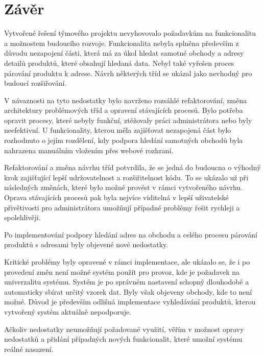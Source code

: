 \documentclass[thesis=B,czech]{FITthesis}[2012/06/26]
\begin{document}
\chapter{Závěr}
Vytvořené řešení týmového projektu nevyhovovalo požadavkům na funkcionalitu a možnostem budoucího rozvoje.
Funkcionalita nebyla splněna především z důvodu nezapojení části, která má za úkol hledat samotné obchody a adresy detailů produktů, které obsahují
hledaná data. Nebyl také vyřešen proces párování produktu k adrese. Návrh některých tříd se ukázal jako nevhodný pro budoucí rozšiřování.
\par
V návaznosti na tyto nedostatky bylo navrženo rozsáhlé refaktorování, změna architektury problémových tříd a opravení stávajících
procesů. Bylo potřeba opravit procesy, které nebyly funkční, ztěžovaly práci administrátora nebo byly neefektivní. U funkcionality, kterou měla zajišťovat nezapojená část bylo rozhodnuto o jejím rozdělení, kdy
podpora hledání samotných obchodů byla nahrazena manuálním vložením přes webové rozhraní.
\par
Refaktorování a změna návrhu tříd potvrdila, že se jedná do budoucna o výhodný krok zajišťující lepší udržovatelnost a rozšiřitelnost kódu. To se ukázalo už při následných změnách, které bylo možné provést v rámci vytvořeného návrhu.
Oprava stávajících procesů pak byla nejvíce viditelná v lepší uživatelské přivětivosti pro administrátora umožňují
případné problémy řešit rychleji a spolehlivěji.
\par
Po implementování podpory hledání adres na obchodu a celého procesu párování produktů s adresami byly
objevené nové nedostatky.
\par
Kritické problémy byly opravené v rámci implementace, ale ukázalo se, že i po provedení změn není možné systém použít pro provoz, kde
je požadavek na univerzalitu systému. Systém je po správném nastavení schopný dlouhodobě a automaticky sbírat určitý vzorek dat. Byly však objeveny obchody, kde to není možné. Důvod je především odlišná implementace vyhledávání produktů, kterou vytvořený systém aktuálně nepodporuje.
\par
Ačkoliv nedostatky neumožňují požadované využití, věřím v možnost opravy nedostatků a přidání případných nových funkcionalit, které
umožní systému reálné nasazení.







\appendix
\end{document}
